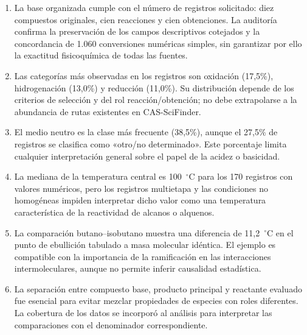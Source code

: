 \begin{enumerate}[leftmargin=*,itemsep=0.55em]
\item La base organizada cumple con el número de registros solicitado: diez compuestos originales, cien reacciones y cien obtenciones. La auditoría confirma la preservación de los campos descriptivos cotejados y la concordancia de 1.060 conversiones numéricas simples, sin garantizar por ello la exactitud fisicoquímica de todas las fuentes.
\item Las categorías más observadas en los registros son oxidación (17,5\%), hidrogenación (13,0\%) y reducción (11,0\%). Su distribución depende de los criterios de selección y del rol reacción/obtención; no debe extrapolarse a la abundancia de rutas existentes en CAS-SciFinder.
\item El medio neutro es la clase más frecuente (38,5\%), aunque el 27,5\% de registros se clasifica como «otro/no determinado». Este porcentaje limita cualquier interpretación general sobre el papel de la acidez o basicidad.
\item La mediana de la temperatura central es 100~$^\circ$C para los 170 registros con valores numéricos, pero los registros multietapa y las condiciones no homogéneas impiden interpretar dicho valor como una temperatura característica de la reactividad de alcanos o alquenos.
\item La comparación butano--isobutano muestra una diferencia de 11,2~$^\circ$C en el punto de ebullición tabulado a masa molecular idéntica. El ejemplo es compatible con la importancia de la ramificación en las interacciones intermoleculares, aunque no permite inferir causalidad estadística.
\item La separación entre compuesto base, producto principal y reactante evaluado fue esencial para evitar mezclar propiedades de especies con roles diferentes. La cobertura de los datos se incorporó al análisis para interpretar las comparaciones con el denominador correspondiente.
\end{enumerate}


